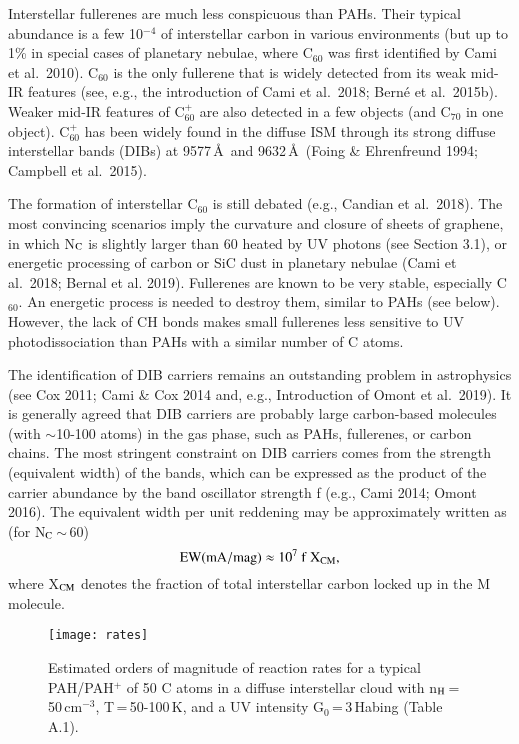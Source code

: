 \documentclass{aa}
\begin{document}
Interstellar fullerenes are much less conspicuous  than PAHs. Their typical abundance is a few 10$^{-4}$ of interstellar carbon in various environments (but up to 1\% in special cases of planetary nebulae, where C$_{60}$ was first identified by Cami et al.\ 2010). C$_{60}$ is the only fullerene that is widely detected from its weak mid-IR features (see, e.g., the introduction of Cami et al.\  2018; Bern\'e et al.\ 2015b).  Weaker mid-IR features of 
C$_{60}^+$ are also detected in a few objects (and C$_{70}$ in one object).   C$_{60}^+$ has been widely found  in the diffuse ISM through its strong 
diffuse interstellar bands (DIBs) at 9577\,\AA\ and 9632\,\AA\ (Foing \& Ehrenfreund 1994; Campbell et al.\ 2015). 

The formation of interstellar  C$_{60}$ is still debated (e.g., Candian et al.\ 2018). The most convincing scenarios imply the curvature and closure of sheets of graphene, in which N$_{\rm C}$ is slightly larger than 60 heated by UV photons (see Section 3.1),
or energetic processing of carbon or SiC dust in planetary nebulae (Cami et al.\ 2018; Bernal et al. 2019).
Fullerenes are known to be very stable, especially C$_{60}$.  An energetic process is needed to destroy them, similar to PAHs (see below). However, the lack of CH bonds makes small fullerenes less sensitive to UV photodissociation than PAHs with a similar number of C atoms. 

The identification of DIB carriers 
remains an outstanding problem in astrophysics (see  Cox 2011; Cami \& Cox 2014 and, e.g., Introduction of Omont et al.\ 2019).
 It  is generally agreed that DIB carriers are probably large carbon-based molecules (with $\sim$10-100 atoms) in the gas phase, such as PAHs, fullerenes, or carbon chains. The most stringent constraint on DIB carriers comes from the strength (equivalent width) of the bands, which can be expressed as the product of the carrier abundance by the band oscillator strength  f (e.g., Cami 2014; Omont 2016). The equivalent width per unit reddening may be approximately written as  (for  N$_{\rm C}$\,$\sim$\,60)
\begin{equation}
{\rm EW(mA/mag)   \approx   10^7~f~X_{CM}}
,\end{equation}
where  X$_{{\rm CM}}$ denotes the fraction of total interstellar carbon locked up in the  M 
molecule. 

\begin{figure*}[htbp]
         \begin{center}
\texttt{[image: rates]}
 \caption{Estimated orders of magnitude of reaction rates for a typical PAH/PAH$^+$ of 50 C atoms in a diffuse interstellar cloud with n$_{\rm H}$\,=\,50\,cm$^{-3}$, T\,=\,50-100\,K, and a UV intensity G$_0$\,=\,3\,Habing (Table A.1).}
     \end{center}
 \end{figure*}
\end{document}
